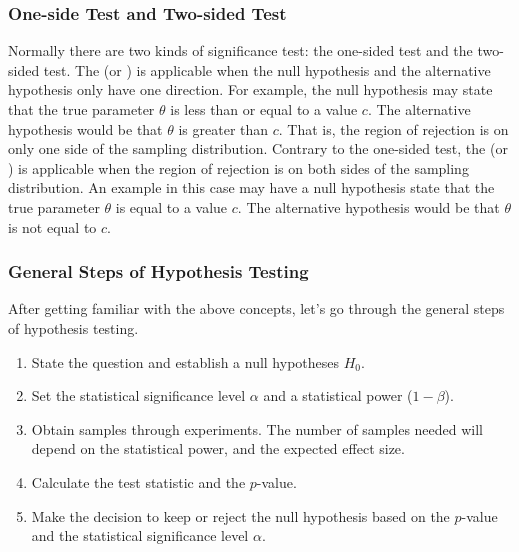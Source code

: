 \documentclass[letterpaper,11pt,english]{sphinxmanual}
\begin{document}
\subsubsection{One-side Test and Two-sided Test}
\label{\detokenize{chapter_appendix_math/statistics:one-side-test-and-two-sided-test}}
Normally there are two kinds of significance test: the one-sided test
and the two-sided test. The  (or ) is
applicable when the null hypothesis and the alternative hypothesis only
have one direction. For example, the null hypothesis may state that the
true parameter \(\theta\) is less than or equal to a value
\(c\). The alternative hypothesis would be that \(\theta\) is
greater than \(c\). That is, the region of rejection is on only one
side of the sampling distribution. Contrary to the one-sided test, the
 (or ) is applicable when the region of
rejection is on both sides of the sampling distribution. An example in
this case may have a null hypothesis state that the true parameter
\(\theta\) is equal to a value \(c\). The alternative hypothesis
would be that \(\theta\) is not equal to \(c\).


\subsubsection{General Steps of Hypothesis Testing}
\label{\detokenize{chapter_appendix_math/statistics:general-steps-of-hypothesis-testing}}
After getting familiar with the above concepts, let’s go through the
general steps of hypothesis testing.
\begin{enumerate}
%
\item {} 
State the question and establish a null hypotheses \(H_0\).

\item {} 
Set the statistical significance level \(\alpha\) and a
statistical power (\(1 - \beta\)).

\item {} 
Obtain samples through experiments. The number of samples needed will
depend on the statistical power, and the expected effect size.

\item {} 
Calculate the test statistic and the \(p\)-value.

\item {} 
Make the decision to keep or reject the null hypothesis based on the
\(p\)-value and the statistical significance level
\(\alpha\).

\end{enumerate}
\end{document}
